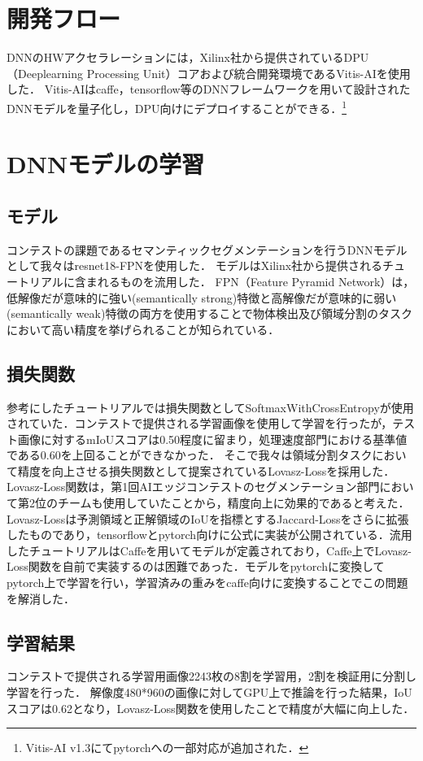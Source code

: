 \section{開発フロー}
DNNのHWアクセラレーションには，Xilinx社から提供されているDPU（Deeplearning Processing Unit）コア\cite{dpuip}および統合開発環境であるVitis-AIを使用した．
Vitis-AIはcaffe，tensorflow等のDNNフレームワークを用いて設計されたDNNモデルを量子化し，DPU向けにデプロイすることができる．\footnote{Vitis-AI v1.3にてpytorchへの一部対応が追加された．}
\section{DNNモデルの学習}
\subsection{モデル}
コンテストの課題であるセマンティックセグメンテーションを行うDNNモデルとして我々はresnet18-FPNを使用した．
モデルはXilinx社から提供されるチュートリアル\cite{tutorial}に含まれるものを流用した．
FPN（Feature Pyramid Network）は，低解像だが意味的に強い(semantically strong)特徴と高解像だが意味的に弱い(semantically weak)特徴の両方を使用することで物体検出及び領域分割のタスクにおいて高い精度を挙げられることが知られている．
\subsection{損失関数}
参考にしたチュートリアルでは損失関数としてSoftmaxWithCrossEntropyが使用されていた．コンテストで提供される学習画像を使用して学習を行ったが，テスト画像に対するmIoUスコアは0.50程度に留まり，処理速度部門における基準値である0.60を上回ることができなかった．
そこで我々は領域分割タスクにおいて精度を向上させる損失関数として提案されているLovasz-Loss\cite{lovasz}を採用した．Lovasz-Loss関数は，第1回AIエッジコンテストのセグメンテーション部門において第2位のチームも使用していたことから\cite{ref_signate_report}，精度向上に効果的であると考えた．
Lovasz-Lossは予測領域と正解領域のIoUを指標とするJaccard-Lossをさらに拡張したものであり，tensorflowとpytorch向けに公式に実装が公開されている．流用したチュートリアルはCaffeを用いてモデルが定義されており，Caffe上でLovasz-Loss関数を自前で実装するのは困難であった．モデルをpytorchに変換してpytorch上で学習を行い，学習済みの重みをcaffe向けに変換することでこの問題を解消した．
\subsection{学習結果}
コンテストで提供される学習用画像2243枚の8割を学習用，2割を検証用に分割し学習を行った．
解像度480*960の画像に対してGPU上で推論を行った結果，IoUスコアは0.62となり，Lovasz-Loss関数を使用したことで精度が大幅に向上した．
